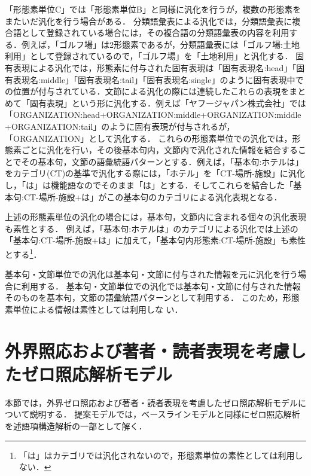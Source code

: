 \documentclass[japanese]{jnlp_1.4}
\begin{document}
「形態素単位C」では「形態素単位B」と同様に汎化を行うが，複数の形態素をまたいだ汎化を行う場合がある．
分類語彙表による汎化では，分類語彙表に複合語として登録されている場合には，その複合語の分類語彙表の内容を利用する．例えば，「ゴルフ場」は2形態素であるが，分類語彙表には「ゴルフ場:土地利用」として登録されているので，「ゴルフ場」を「土地利用」と汎化する．
固有表現による汎化では，形態素に付与された固有表現は「固有表現名:head」「固有表現名:middle」「固有表現名:tail」「固有表現名:single」のように固有表現中での位置が付与されている．文節による汎化の際には連続したこれらの表現をまとめて「固有表現」という形に汎化する．例えば「ヤフージャパン株式会社」では「ORGANIZATION:head+ORGANIZATION:middle+ORGANIZATION:middle+\linebreak[2]ORGANIZATION:tail」のように固有表現が付与されるが，「ORGANIZATION」として汎化する．
これらの形態素単位での汎化では，形態素ごとに汎化を行い，その後基本句内，文節内で汎化された情報を結合することでその基本句，文節の語彙統語パターンとする．例えば，「基本句:ホテルは」をカテゴリ(CT)の基準で汎化する際には，「ホテル」を「CT-場所-施設」に汎化し，「は」は機能語なのでそのまま「は」とする．そしてこれらを結合した「基本句:CT-場所-施設+は」がこの基本句のカテゴリによる汎化表現となる．

上述の形態素単位の汎化の場合には，基本句，文節内に含まれる個々の汎化表現も素性とする．
例えば，「基本句:ホテルは」のカテゴリによる汎化では上述の「基本句:CT-場所-施設+は」に加えて，「基本句内形態素:CT-場所-施設」も素性とする\footnote{「は」はカテゴリでは汎化されないので，形態素単位の素性としては利用しない．}．

基本句・文節単位での汎化は基本句・文節に付与された情報を元に汎化を行う場合に利用する．
基本句・文節単位での汎化では基本句・文節に付与された情報そのものを基本句，文節の語彙統語パターンとして利用する．
このため，形態素単位による情報は素性としては利用しな
\linebreak
い．



\section{外界照応および著者・読者表現を考慮したゼロ照応解析モデル}
\label{115042_18Jun13}

本節では，外界ゼロ照応および著者・読者表現を考慮したゼロ照応解析モデルについて説明する．
提案モデルでは，ベースラインモデルと同様にゼロ照応解析を述語項構造解析の一部として解く．
\end{document}
